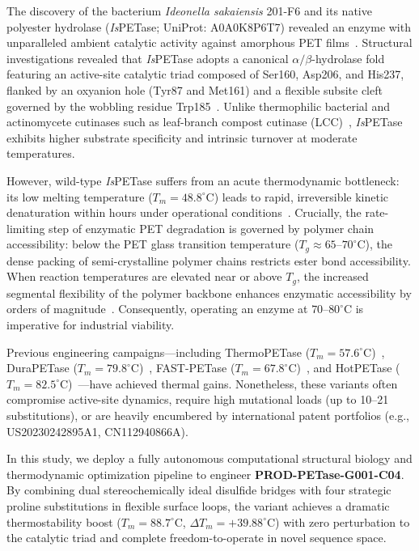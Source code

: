 \documentclass[journal=natcat,manuscript=article]{achemso}
\begin{document}
The discovery of the bacterium \textit{Ideonella sakaiensis} 201-F6 and its native polyester hydrolase (\textit{Is}PETase; UniProt: A0A0K8P6T7) revealed an enzyme with unparalleled ambient catalytic activity against amorphous PET films~\cite{Yoshida2016}. Structural investigations revealed that \textit{Is}PETase adopts a canonical $\alpha/\beta$-hydrolase fold featuring an active-site catalytic triad composed of Ser160, Asp206, and His237, flanked by an oxyanion hole (Tyr87 and Met161) and a flexible subsite cleft governed by the wobbling residue Trp185~\cite{Han2017,Austin2018}. Unlike thermophilic bacterial and actinomycete cutinases such as leaf-branch compost cutinase (LCC)~\cite{Tournier2020}, \textit{Is}PETase exhibits higher substrate specificity and intrinsic turnover at moderate temperatures.

However, wild-type \textit{Is}PETase suffers from an acute thermodynamic bottleneck: its low melting temperature ($T_m = 48.8^\circ\text{C}$) leads to rapid, irreversible kinetic denaturation within hours under operational conditions~\cite{Joo2018}. Crucially, the rate-limiting step of enzymatic PET degradation is governed by polymer chain accessibility: below the PET glass transition temperature ($T_g \approx 65\text{--}70^\circ\text{C}$), the dense packing of semi-crystalline polymer chains restricts ester bond accessibility. When reaction temperatures are elevated near or above $T_g$, the increased segmental flexibility of the polymer backbone enhances enzymatic accessibility by orders of magnitude~\cite{Ronkvist2009}. Consequently, operating an enzyme at $70\text{--}80^\circ\text{C}$ is imperative for industrial viability.

Previous engineering campaigns---including ThermoPETase ($T_m = 57.6^\circ\text{C}$)~\cite{Son2019}, DuraPETase ($T_m = 79.8^\circ\text{C}$)~\cite{Cui2021}, FAST-PETase ($T_m = 67.8^\circ\text{C}$)~\cite{Lu2022}, and HotPETase ($T_m = 82.5^\circ\text{C}$)~\cite{Bell2022}---have achieved thermal gains. Nonetheless, these variants often compromise active-site dynamics, require high mutational loads (up to 10--21 substitutions), or are heavily encumbered by international patent portfolios (e.g., US20230242895A1, CN112940866A).

In this study, we deploy a fully autonomous computational structural biology and thermodynamic optimization pipeline to engineer \textbf{PROD-PETase-G001-C04}. By combining dual stereochemically ideal disulfide bridges with four strategic proline substitutions in flexible surface loops, the variant achieves a dramatic thermostability boost ($T_m = 88.7^\circ\text{C}$, $\Delta T_m = +39.88^\circ\text{C}$) with zero perturbation to the catalytic triad and complete freedom-to-operate in novel sequence space.
\end{document}
